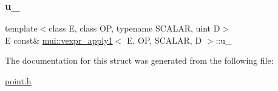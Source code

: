 \subsubsection{\texorpdfstring{u\+\_\+}{u\_}}
{\footnotesize\ttfamily template$<$class E, class OP, typename S\+C\+A\+L\+AR, uint D$>$ \\
E const\& \hyperlink{structmui_1_1vexpr__apply1}{mui\+::vexpr\+\_\+apply1}$<$ E, OP, S\+C\+A\+L\+AR, D $>$\+::u\+\_\+\hspace{0.3cm}{\ttfamily [protected]}}



The documentation for this struct was generated from the following file\+:\begin{DoxyCompactItemize}
\item 
\hyperlink{point_8h}{point.\+h}\end{DoxyCompactItemize}
